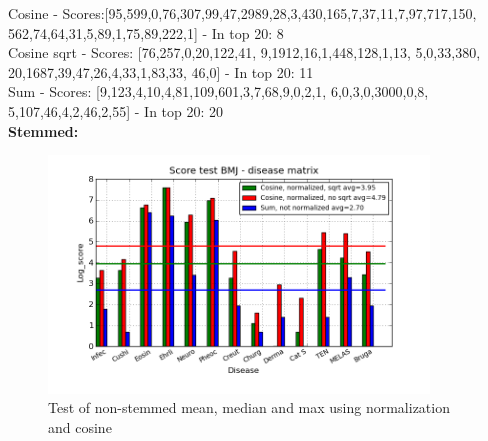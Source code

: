 {\small 
Cosine - Scores:[95,599,0,76,307,99,47,2989,28,3,430,165,7,37,11,7,97,717,150, 562,74,64,31,5,89,1,75,89,222,1] - In top 20: 8 \\
Cosine sqrt - Scores: [76,257,0,20,122,41, 9,1912,16,1,448,128,1,13, 5,0,33,380, 20,1687,39,47,26,4,33,1,83,33, 46,0] - In top 20: 11 \\
Sum - Scores: [9,123,4,10,4,81,109,601,3,7,68,9,0,2,1, 6,0,3,0,3000,0,8, 5,107,46,4,2,46,2,55] - In top 20: 20 \\
}
\textbf{Stemmed:}

\begin{figure}[h!]
        \begin{center}
          \includegraphics[width=0.9\textwidth]{barcharts/diseaseMatrix_bmj_hist_norm_3000_s_cos_sqrt_cos_sum_nn.png}
        \end{center}
        \caption{Test of non-stemmed mean, median and max using normalization and cosine}
        \label{diseaseMatrix_bmj_hist_norm_3000_s_cos_sqrt_cos_sum_nn}
\end{figure}

